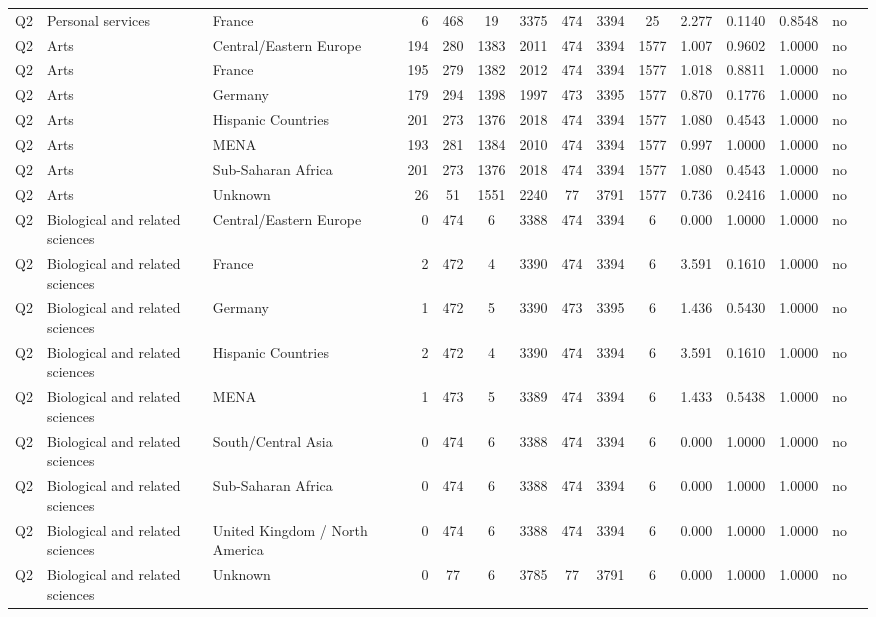 \begin{longtable}{lllrcccccccccll}
Q2 & Personal services & France & 6 & 468 & 19 & 3375 & 474 & 3394 & 25 & 2.277 & 0.1140 & 0.8548 & no \\
Q2 & Arts & Central/Eastern Europe & 194 & 280 & 1383 & 2011 & 474 & 3394 & 1577 & 1.007 & 0.9602 & 1.0000 & no \\
Q2 & Arts & France & 195 & 279 & 1382 & 2012 & 474 & 3394 & 1577 & 1.018 & 0.8811 & 1.0000 & no \\
Q2 & Arts & Germany & 179 & 294 & 1398 & 1997 & 473 & 3395 & 1577 & 0.870 & 0.1776 & 1.0000 & no \\
Q2 & Arts & Hispanic Countries & 201 & 273 & 1376 & 2018 & 474 & 3394 & 1577 & 1.080 & 0.4543 & 1.0000 & no \\
Q2 & Arts & MENA & 193 & 281 & 1384 & 2010 & 474 & 3394 & 1577 & 0.997 & 1.0000 & 1.0000 & no \\
Q2 & Arts & Sub-Saharan Africa & 201 & 273 & 1376 & 2018 & 474 & 3394 & 1577 & 1.080 & 0.4543 & 1.0000 & no \\
Q2 & Arts & Unknown & 26 & 51 & 1551 & 2240 & 77 & 3791 & 1577 & 0.736 & 0.2416 & 1.0000 & no \\
Q2 & Biological and related sciences & Central/Eastern Europe & 0 & 474 & 6 & 3388 & 474 & 3394 & 6 & 0.000 & 1.0000 & 1.0000 & no \\
Q2 & Biological and related sciences & France & 2 & 472 & 4 & 3390 & 474 & 3394 & 6 & 3.591 & 0.1610 & 1.0000 & no \\
Q2 & Biological and related sciences & Germany & 1 & 472 & 5 & 3390 & 473 & 3395 & 6 & 1.436 & 0.5430 & 1.0000 & no \\
Q2 & Biological and related sciences & Hispanic Countries & 2 & 472 & 4 & 3390 & 474 & 3394 & 6 & 3.591 & 0.1610 & 1.0000 & no \\
Q2 & Biological and related sciences & MENA & 1 & 473 & 5 & 3389 & 474 & 3394 & 6 & 1.433 & 0.5438 & 1.0000 & no \\
Q2 & Biological and related sciences & South/Central Asia & 0 & 474 & 6 & 3388 & 474 & 3394 & 6 & 0.000 & 1.0000 & 1.0000 & no \\
Q2 & Biological and related sciences & Sub-Saharan Africa & 0 & 474 & 6 & 3388 & 474 & 3394 & 6 & 0.000 & 1.0000 & 1.0000 & no \\
Q2 & Biological and related sciences & United Kingdom / North America & 0 & 474 & 6 & 3388 & 474 & 3394 & 6 & 0.000 & 1.0000 & 1.0000 & no \\
Q2 & Biological and related sciences & Unknown & 0 & 77 & 6 & 3785 & 77 & 3791 & 6 & 0.000 & 1.0000 & 1.0000 & no \\

\end{longtable}

